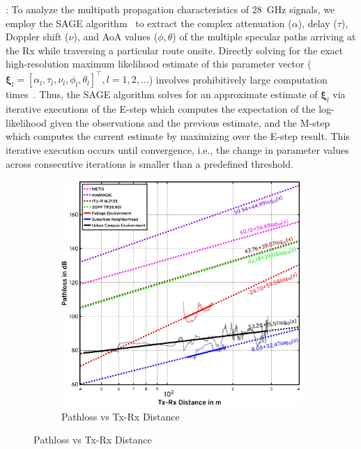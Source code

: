 \documentclass[12pt, draftcls, onecolumn]{IEEEtran}
\begin{document}
{: To analyze the multipath propagation characteristics of \SI{28}{\giga\hertz} signals, we employ the SAGE algorithm~\cite{SAGE} to extract the complex attenuation ($\alpha$), delay ($\tau$), Doppler shift ($\nu$), and AoA values ($\phi,\theta$) of the multiple specular paths arriving at the Rx while traversing a particular route onsite. Directly solving for the exact high-resolution maximum likelihood estimate of this parameter vector ($\boldsymbol{\xi}_{l}{=}[\alpha_{l},\tau_{l},\nu_{l},\phi_{l},\theta_{l}]^{\intercal},l{=}1,2,{\dots}$) involves prohibitively large computation times~\cite{SAGE}. Thus, the SAGE algorithm solves for an approximate estimate of $\boldsymbol{\xi}_{l}$ via iterative executions of the E-step which computes the expectation of the log-likelihood given the observations and the previous estimate, and the M-step which computes the current estimate by maximizing over the E-step result. This iterative execution occurs until convergence, i.e., the change in parameter values across consecutive iterations is smaller than a predefined threshold.
\begin{figure} [t]
     \centering
     \begin{subfigure}{0.4835\linewidth}
         \centering
         \includegraphics[width=1.0\linewidth]{figs/pathloss_vs_distance.pdf}
         \caption{Pathloss vs Tx-Rx Distance}
         \label{F7a}
     \end{subfigure}

\end{figure}}
\end{document}
